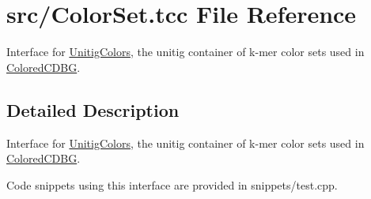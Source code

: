 \hypertarget{ColorSet_8tcc}{}\section{src/\+Color\+Set.tcc File Reference}
\label{ColorSet_8tcc}


Interface for \hyperlink{classUnitigColors}{Unitig\+Colors}, the unitig container of k-\/mer color sets used in \hyperlink{classColoredCDBG}{Colored\+C\+D\+BG}.  




\subsection{Detailed Description}
Interface for \hyperlink{classUnitigColors}{Unitig\+Colors}, the unitig container of k-\/mer color sets used in \hyperlink{classColoredCDBG}{Colored\+C\+D\+BG}. 

Code snippets using this interface are provided in snippets/test.\+cpp. 